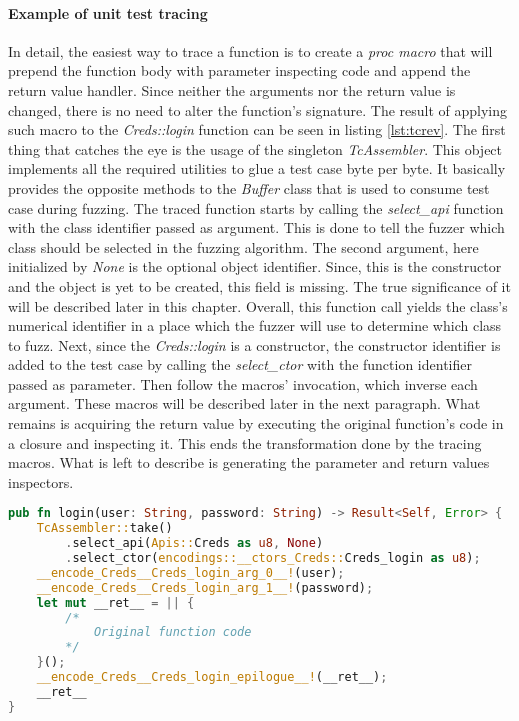 \paragraph{Example of unit test tracing}
In detail, the easiest way to trace a function is to create a \textit{proc macro} that will prepend the function body with parameter inspecting code and append the return value handler. Since neither the arguments nor the return value is changed, there is no need to alter the function's signature. The result of applying such macro to the \textit{Creds::login} function can be seen in listing \ref{lst:tcrev}. The first thing that catches the eye is the usage of the singleton \textit{TcAssembler}. This object implements all the required utilities to glue a test case byte per byte. It basically provides the opposite methods to the \textit{Buffer} class that is used to consume test case during fuzzing. The traced function starts by calling the \textit{select\_api} function with the class identifier passed as argument. This is done to tell the fuzzer which class should be selected in the fuzzing algorithm. The second argument, here initialized by \textit{None} is the optional object identifier. Since, this is the constructor and the object is yet to be created, this field is missing. The true significance of it will be described later in this chapter. Overall, this function call yields the class's numerical identifier in a place which the fuzzer will use to determine which class to fuzz. Next, since the \textit{Creds::login} is a constructor, the constructor identifier is added to the test case by calling the \textit{select\_ctor} with the function identifier passed as parameter. Then follow the macros' invocation, which inverse each argument. These macros will be described later in the next paragraph. What remains is acquiring the return value by executing the original function's code in a closure and inspecting it. This ends the transformation done by the tracing macros. What is left to describe is generating the parameter and return values inspectors.

\begin{minipage}{\linewidth}
\begin{lstlisting}[language=rust,caption={Example testcase reversing code.},label={lst:tcrev}]
pub fn login(user: String, password: String) -> Result<Self, Error> {
    TcAssembler::take()
        .select_api(Apis::Creds as u8, None)
        .select_ctor(encodings::__ctors_Creds::Creds_login as u8);
    __encode_Creds__Creds_login_arg_0__!(user);
    __encode_Creds__Creds_login_arg_1__!(password);
    let mut __ret__ = || {
        /*
            Original function code
        */
    }();
    __encode_Creds__Creds_login_epilogue__!(__ret__);
    __ret__
}
\end{lstlisting}
\end{minipage}


